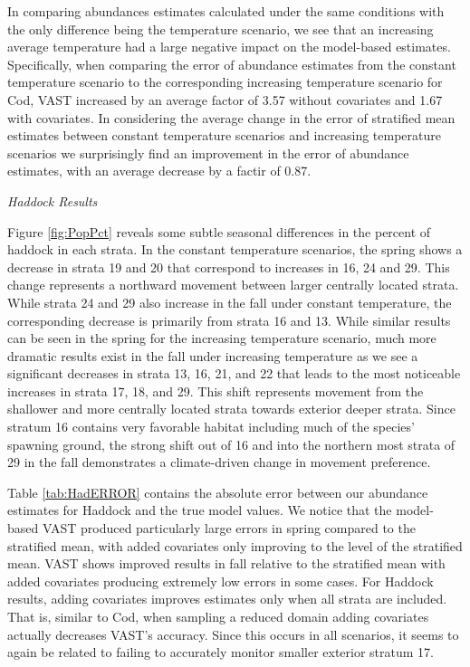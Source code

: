 \documentclass[
  12pt,
]{article}
\begin{document}
In comparing abundances estimates calculated under the same conditions with the only difference being the temperature scenario, we see that an increasing average temperature had a large negative impact on the model-based estimates. Specifically, when comparing the error of abundance estimates from the constant temperature scenario to the corresponding increasing temperature scenario for Cod, VAST increased by an average factor of 3.57 without covariates and 1.67 with covariates. In considering the average change in the error of stratified mean estimates between constant temperature scenarios and increasing temperature scenarios we surprisingly find an improvement in the error of abundance estimates, with an average decrease by a factir of 0.87.

\emph{Haddock Results}

Figure \ref{fig:PopPct} reveals some subtle seasonal differences in the percent of haddock in each strata. In the constant temperature scenarios, the spring shows a decrease in strata 19 and 20 that correspond to increases in 16, 24 and 29. This change represents a northward movement between larger centrally located strata. While strata 24 and 29 also increase in the fall under constant temperature, the corresponding decrease is primarily from strata 16 and 13. While similar results can be seen in the spring for the increasing temperature scenario, much more dramatic results exist in the fall under increasing temperature as we see a significant decreases in strata 13, 16, 21, and 22 that leads to the most noticeable increases in strata 17, 18, and 29. This shift represents movement from the shallower and more centrally located strata towards exterior deeper strata. Since stratum 16 contains very favorable habitat including much of the species' spawning ground, the strong shift out of 16 and into the northern most strata of 29 in the fall demonstrates a climate-driven change in movement preference.

Table \ref{tab:HadERROR} contains the absolute error between our abundance estimates for Haddock and the true model values. We notice that the model-based VAST produced particularly large errors in spring compared to the stratified mean, with added covariates only improving to the level of the stratified mean. VAST shows improved results in fall relative to the stratified mean with added covariates producing extremely low errors in some cases. For Haddock results, adding covariates improves estimates only when all strata are included. That is, similar to Cod, when sampling a reduced domain adding covariates actually decreases VAST's accuracy. Since this occurs in all scenarios, it seems to again be related to failing to accurately monitor smaller exterior stratum 17.
\end{document}
